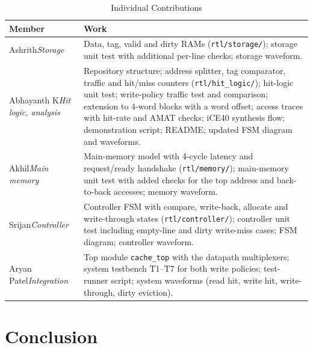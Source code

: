 \documentclass[conference]{IEEEtran}
\begin{document}
\begin{table}[t]
\caption{Individual Contributions}
\label{tab:contrib}
\centering
\footnotesize
\begin{tabular}{@{}p{1.55cm}p{6.75cm}@{}}
\toprule
Member & Work \\
\midrule
Ashrith\newline\emph{Storage} & Data, tag, valid and dirty RAMs (\texttt{rtl/storage/}); storage unit test with additional per-line checks; storage waveform. \\
\addlinespace
Abhayanth K\newline\emph{Hit logic, analysis} & Repository structure; address splitter, tag comparator, traffic and hit/miss counters (\texttt{rtl/hit\_logic/}); hit-logic unit test; write-policy traffic test and comparison; extension to 4-word blocks with a word offset; access traces with hit-rate and AMAT checks; iCE40 synthesis flow; demonstration script; README; updated FSM diagram and waveforms. \\
\addlinespace
Akhil\newline\emph{Main memory} & Main-memory model with 4-cycle latency and request/ready handshake (\texttt{rtl/memory/}); main-memory unit test with added checks for the top address and back-to-back accesses; memory waveform. \\
\addlinespace
Srijan\newline\emph{Controller} & Controller FSM with compare, write-back, allocate and write-through states (\texttt{rtl/controller/}); controller unit test including empty-line and dirty write-miss cases; FSM diagram; controller waveform. \\
\addlinespace
Aryan Patel\newline\emph{Integration} & Top module \texttt{cache\_top} with the datapath multiplexers; system testbench T1--T7 for both write policies; test-runner script; system waveforms (read hit, write hit, write-through, dirty eviction). \\
\bottomrule
\end{tabular}
\end{table}

\section{Conclusion}
\label{sec:concl}
\end{document}
